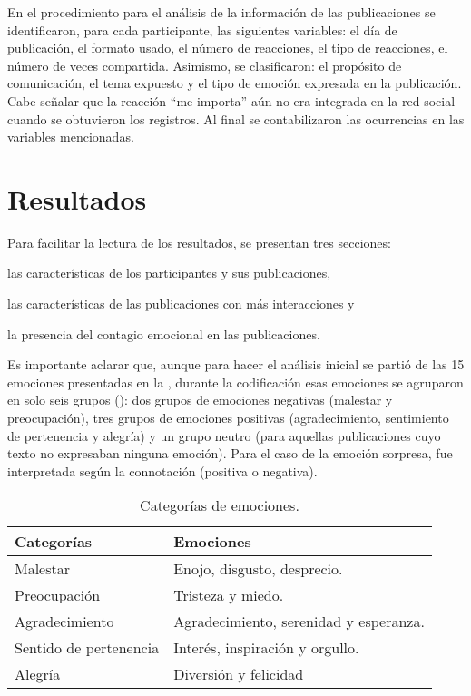 \documentclass{textolivre}
\begin{document}
En el procedimiento para el análisis de la información de las publicaciones se identificaron, para cada participante, las siguientes variables: el día de publicación, el formato usado, el número de reacciones, el tipo de reacciones, el número de veces compartida. Asimismo, se clasificaron: el propósito de comunicación, el tema expuesto y el tipo de emoción expresada en la publicación. Cabe señalar que la reacción “me importa” aún no era integrada en la red social cuando se obtuvieron los registros. Al final se contabilizaron las ocurrencias en las variables mencionadas. 


\section{Resultados}
Para facilitar la lectura de los resultados, se presentan tres secciones: 
\begin{enumerate*}[label=\arabic*)] 
\item las características de los participantes y sus publicaciones,
\item las características de las publicaciones con más interacciones y 
\item la presencia del contagio emocional en las publicaciones. 
\end{enumerate*}

Es importante aclarar que, aunque para hacer el análisis inicial se partió de las 15 emociones presentadas en la , durante la codificación esas emociones se agruparon en solo seis grupos (): dos grupos de emociones negativas (malestar y preocupación), tres grupos de emociones positivas (agradecimiento, sentimiento de pertenencia y alegría) y un grupo neutro (para aquellas publicaciones cuyo texto no expresaban ninguna emoción). Para el caso de la emoción sorpresa, fue interpretada según la connotación (positiva o negativa).

%
%
%
\begin{table}[htpb]
\caption{Categorías de emociones.}
\label{tab02}
\centering
\begin{tabular}{ll}
\toprule 
Categorías & Emociones \\
\midrule 
Malestar & Enojo, disgusto, desprecio. \\
Preocupación & Tristeza y miedo. \\
Agradecimiento & Agradecimiento, serenidad y esperanza. \\
Sentido de pertenencia & Interés, inspiración y orgullo. \\
Alegría & Diversión y felicidad \\
\bottomrule
\end{tabular}
\end{table}
\end{document}
